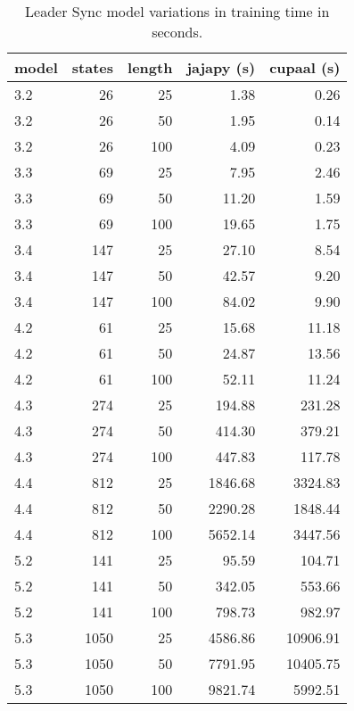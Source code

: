 \begin{table}[htb!]
    \centering
    \caption{Leader Sync model variations in training time in seconds.}
    \label{tab:leader_results}
    \begin{tabular}{lrrrr}
        \toprule
        model & states & length & jajapy (s) & cupaal (s) \\
        \midrule
        3.2   & 26     & 25     & 1.38       & 0.26       \\
        3.2   & 26     & 50     & 1.95       & 0.14       \\
        3.2   & 26     & 100    & 4.09       & 0.23       \\
        3.3   & 69     & 25     & 7.95       & 2.46       \\
        3.3   & 69     & 50     & 11.20      & 1.59       \\
        3.3   & 69     & 100    & 19.65      & 1.75       \\
        3.4   & 147    & 25     & 27.10      & 8.54       \\
        3.4   & 147    & 50     & 42.57      & 9.20       \\
        3.4   & 147    & 100    & 84.02      & 9.90       \\
        4.2   & 61     & 25     & 15.68      & 11.18      \\
        4.2   & 61     & 50     & 24.87      & 13.56      \\
        4.2   & 61     & 100    & 52.11      & 11.24      \\
        4.3   & 274    & 25     & 194.88     & 231.28     \\
        4.3   & 274    & 50     & 414.30     & 379.21     \\
        4.3   & 274    & 100    & 447.83     & 117.78     \\
        4.4   & 812    & 25     & 1846.68    & 3324.83    \\
        4.4   & 812    & 50     & 2290.28    & 1848.44    \\
        4.4   & 812    & 100    & 5652.14    & 3447.56    \\
        5.2   & 141    & 25     & 95.59      & 104.71     \\
        5.2   & 141    & 50     & 342.05     & 553.66     \\
        5.2   & 141    & 100    & 798.73     & 982.97     \\
        5.3   & 1050   & 25     & 4586.86    & 10906.91   \\
        5.3   & 1050   & 50     & 7791.95    & 10405.75   \\
        5.3   & 1050   & 100    & 9821.74    & 5992.51    \\
        \bottomrule
    \end{tabular}
\end{table}


